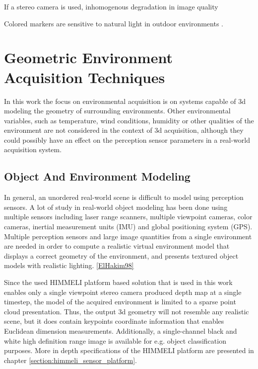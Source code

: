 \documentclass[12pt,a4paper,oneside,pdftex]{report}
\begin{document}
{If a stereo camera is used, inhomogenous degradation in image quality


Colored markers are sensitive to natural light in outdoor environments \cite{Kawai12}.

\section{Geometric Environment Acquisition Techniques}
\label{section:environment_acquisition_techniques}

In this work the focus on environmental acquisition is on systems capable of 3d modeling the geometry of surrounding environments. Other environmental variables, such as temperature, wind conditions, humidity or other qualities of the environment are not considered in the context of 3d acquisition, although they could possibly have an effect on the perception sensor parameters in a real-world acquisition system. 

\subsection{Object And Environment Modeling}

In general, an unordered real-world scene is difficult to model using perception sensors. A lot of study in real-world object modeling has been done using multiple sensors including laser range scanners, multiple viewpoint cameras, color cameras, inertial measurement units (IMU) and global positioning system (GPS). Multiple perception sensors and large image quantities from a single environment are needed in order to compute a realistic virtual environment model that displays a correct geometry of the environment, and presents textured object models with realistic lighting. \ref{ElHakim98}



Since the used HIMMELI platform based solution that is used in this work enables only a single viewpoint stereo camera produced depth map at a single timestep, the model of the acquired environment is limited to a sparse point cloud presentation. Thus, the output 3d geometry will not resemble any realistic scene, but it does contain keypoints coordinate information that enables Euclidean dimension measurements. Additionally, a single-channel black and white high definition range image is available for e.g. object classification purposes. More in depth specifications of the HIMMELI platform are presented in chapter \ref{section:himmeli_sensor_platform}.

}
\end{document}
